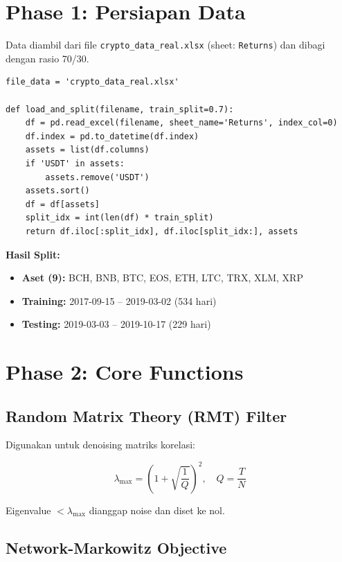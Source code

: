 \documentclass[12pt,a4paper]{article}
\begin{document}
\section{Phase 1: Persiapan Data}

Data diambil dari file \texttt{crypto\_data\_real.xlsx} (sheet: \texttt{Returns}) dan dibagi dengan rasio 70/30.

\begin{lstlisting}[caption={Load \& Split Data}]
file_data = 'crypto_data_real.xlsx'

def load_and_split(filename, train_split=0.7):
    df = pd.read_excel(filename, sheet_name='Returns', index_col=0)
    df.index = pd.to_datetime(df.index)
    assets = list(df.columns)
    if 'USDT' in assets:
        assets.remove('USDT')
    assets.sort()
    df = df[assets]
    split_idx = int(len(df) * train_split)
    return df.iloc[:split_idx], df.iloc[split_idx:], assets
\end{lstlisting}

\noindent\textbf{Hasil Split:}
\begin{itemize}
  \item \textbf{Aset (9):} BCH, BNB, BTC, EOS, ETH, LTC, TRX, XLM, XRP
  \item \textbf{Training:} 2017-09-15 -- 2019-03-02 (534 hari)
  \item \textbf{Testing:} 2019-03-03 -- 2019-10-17 (229 hari)
\end{itemize}

\section{Phase 2: Core Functions}

\subsection{Random Matrix Theory (RMT) Filter}

Digunakan untuk denoising matriks korelasi:

\begin{equation}
  \lambda_{\max} = \left(1 + \sqrt{\frac{1}{Q}}\right)^2, \quad Q = \frac{T}{N}
\end{equation}

Eigenvalue $< \lambda_{\max}$ dianggap noise dan diset ke nol.

\subsection{Network-Markowitz Objective}
\end{document}
